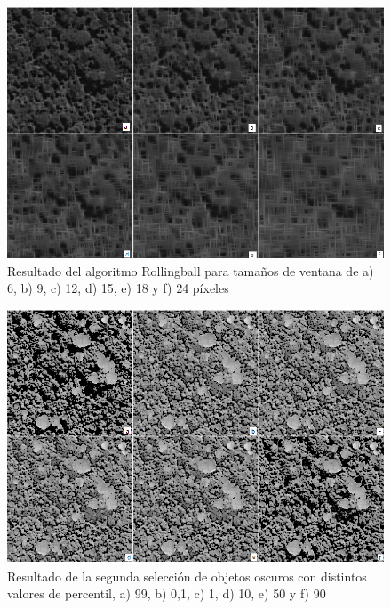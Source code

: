 \begin{figure}[H]
    \includegraphics[width=\textwidth]{Imagenes/Resultados script morfologico/GS04-labeled.png}
     \caption{Resultado del algoritmo Rollingball para tamaños de ventana de a) 6, b) 9, c) 12, d) 15, e) 18 y f) 24 píxeles}
    \label{Rollingball}
\end{figure}
\begin{figure}[H]
    \includegraphics[width=\textwidth]{Imagenes/Resultados script morfologico/GS06-labeled.png}
     \caption{Resultado de la segunda selección de objetos oscuros con distintos valores de percentil, a) 99, b) 0,1, c) 1, d) 10, e) 50 y f) 90 }
    \label{segundaoscuros}
\end{figure}
